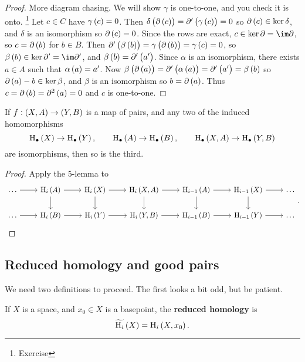 \begin{proof}
More diagram chasing. We will show $ \gamma $ is one-to-one, and you check it is onto. \footnote{Exercise} Let $ c \in C $ have $ \gamma\br{c} = 0 $. Then $ \delta\br{\da\br{c}} = \da'\br{\gamma\br{c}} = 0 $ so $ \da\br{c} \in \ker \delta $, and $ \delta $ is an isomorphism so $ \da\br{c} = 0 $. Since the rows are exact, $ c \in \ker \da = \im \da $, so $ c = \da\br{b} $ for $ b \in B $. Then $ \da'\br{\beta\br{b}} = \gamma\br{\da\br{b}} = \gamma\br{c} = 0 $, so $ \beta\br{b} \in \ker \da' = \im \da' $, and $ \beta\br{b} = \da'\br{a'} $. Since $ \alpha $ is an isomorphism, there exists $ a \in A $ such that $ \alpha\br{a} = a' $. Now $ \beta\br{\da\br{a}} = \da'\br{\alpha\br{a}} = \da'\br{a'} = \beta\br{b} $ so $ \da\br{a} - b \in \ker \beta $, and $ \beta $ is an isomorphism so $ b = \da\br{a} $. Thus $ c = \da\br{b} = \da^2\br{a} = 0 $ and $ c $ is one-to-one.
\end{proof}

\begin{corollary}
If $ f : \br{X, A} \to \br{Y, B} $ is a map of pairs, and any two of the induced homomorphisms
$$ \H_\bullet\br{X} \to \H_\bullet\br{Y}, \qquad \H_\bullet\br{A} \to \H_\bullet\br{B}, \qquad \H_\bullet\br{X, A} \to \H_\bullet\br{Y, B} $$
are isomorphisms, then so is the third.
\end{corollary}

\begin{proof}
Apply the $ 5 $-lemma to
$$
\begin{tikzcd}
\dots \arrow{r} & \H_i\br{A} \arrow{r} \arrow{d} & \H_i\br{X} \arrow{r} \arrow{d} & \H_i\br{X, A} \arrow{r} \arrow{d} & \H_{i - 1}\br{A} \arrow{r} \arrow{d} & \H_{i - 1}\br{X} \arrow{r} \arrow{d} & \dots \\
\dots \arrow{r} & \H_i\br{B} \arrow{r} & \H_i\br{Y} \arrow{r} & \H_i\br{Y, B} \arrow{r} & \H_{i - 1}\br{B} \arrow{r} & \H_{i - 1}\br{Y} \arrow{r} & \dots
\end{tikzcd}.
$$
\end{proof}

\pagebreak

\subsection{Reduced homology and good pairs}

We need two definitions to proceed. The first looks a bit odd, but be patient.

\begin{definition*}
If $ X $ is a space, and $ x_0 \in X $ is a basepoint, the \textbf{reduced homology} is
$$ \widetilde{\H_i}\br{X} = \H_i\br{X, x_0}. $$
\end{definition*}

